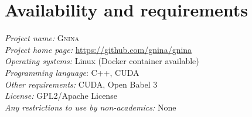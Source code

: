 \documentclass[linenumbers,doublespacing]{bmcart}
\begin{document}

\section*{Availability and requirements}
\textit{Project name:} \textsc{Gnina} \\
\textit{Project home page:} \url{https://github.com/gnina/gnina} \\
\textit{Operating systems:} Linux (Docker container available)\\
\textit{Programming language}: C++, CUDA \\
\textit{Other requirements:} CUDA, Open Babel 3 \\
\textit{License:} GPL2/Apache License \\
\textit{Any restrictions to use by non-academics:} None \\
\end{document}
